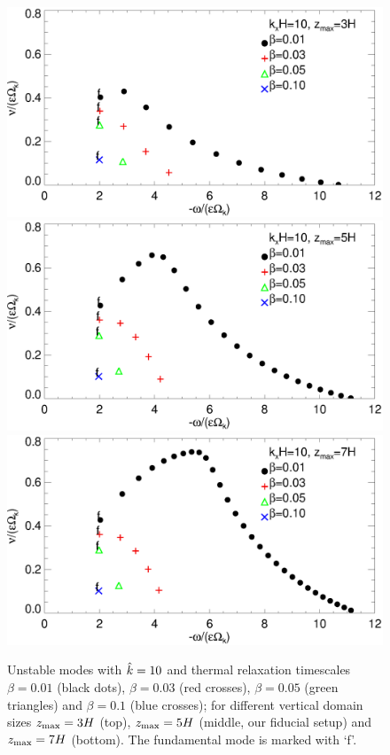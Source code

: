 \begin{figure}
  \includegraphics[width=\linewidth,clip=true,trim=0cm 1.75cm 0cm
  0cm]{figures/compare_modes_cool_kx10_z3.ps} 
  \includegraphics[width=\linewidth,clip=true,trim=0cm 1.75cm 0cm
  0cm]{figures/compare_modes_cool_kx10_z5.ps}
  \includegraphics[width=\linewidth]{figures/compare_modes_cool_kx10_z7.ps}
  \caption{Unstable modes with $\hat{k}=10$ and thermal
    relaxation timescales $\beta=0.01$ (black dots), $\beta=0.03$ (red
    crosses), $\beta=0.05$ (green triangles) and $\beta=0.1$ (blue
    crosses); for different vertical domain sizes $z_\mathrm{max}=3H$ (top),
    $z_\mathrm{max}=5H$ (middle, our fiducial setup) and $z_\mathrm{max}=7H$
    (bottom). The fundamental mode is marked with `f'.  
    \label{compare_modes_cool_kx10} 
  }
\end{figure}

